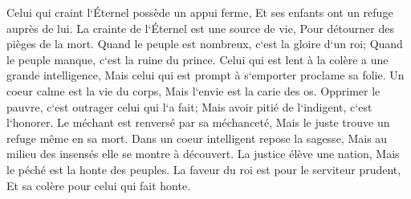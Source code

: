 \verse Celui qui craint l`Éternel possède un appui ferme, Et ses enfants ont un refuge auprès de lui. 
\verse La crainte de l`Éternel est une source de vie, Pour détourner des pièges de la mort. 
\verse Quand le peuple est nombreux, c`est la gloire d`un roi; Quand le peuple manque, c`est la ruine du prince. 
\verse Celui qui est lent à la colère a une grande intelligence, Mais celui qui est prompt à s`emporter proclame sa folie. 
\verse Un coeur calme est la vie du corps, Mais l`envie est la carie des os. 
\verse Opprimer le pauvre, c`est outrager celui qui l`a fait; Mais avoir pitié de l`indigent, c`est l`honorer. 
\verse Le méchant est renversé par sa méchanceté, Mais le juste trouve un refuge même en sa mort. 
\verse Dans un coeur intelligent repose la sagesse, Mais au milieu des insensés elle se montre à découvert. 
\verse La justice élève une nation, Mais le péché est la honte des peuples. 
\verse La faveur du roi est pour le serviteur prudent, Et sa colère pour celui qui fait honte. 

